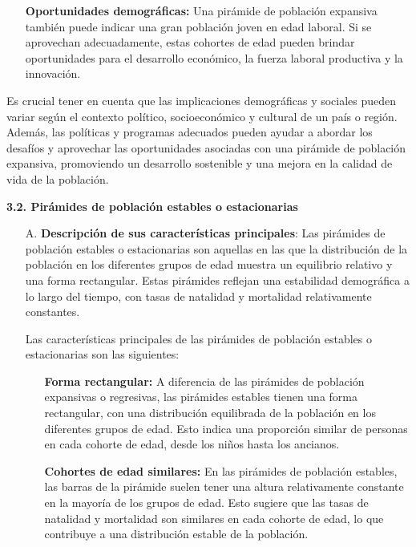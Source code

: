 \documentclass[8pt,a4paper]{beamer}
\begin{document}
{\begin{frame}{}
\begin{block}{}
\begin{enumerate}
\begin{enumerate}
\begin{itemize}
\item[\ding{65}] \textbf{Oportunidades demográficas:} Una pirámide de población expansiva también puede indicar una gran población joven en edad laboral. Si se aprovechan adecuadamente, estas cohortes de edad pueden brindar oportunidades para el desarrollo económico, la fuerza laboral productiva y la innovación.
\end{itemize}
\end{enumerate}
Es crucial tener en cuenta que las implicaciones demográficas y sociales pueden variar según el contexto político, socioeconómico y cultural de un país o región. Además, las políticas y programas adecuados pueden ayudar a abordar los desafíos y aprovechar las oportunidades asociadas con una pirámide de población expansiva, promoviendo un desarrollo sostenible y una mejora en la calidad de vida de la población.
\end{enumerate}
\end{block}
\end{frame}

\begin{frame}{}
\begin{block}{\textbf{3.2. Pirámides de población estables o estacionarias}}
\justifying
\begin{enumerate}
\justifying
\item[A.] \textbf{Descripción de sus características principales}:  Las pirámides de población estables o estacionarias son aquellas en las que la distribución de la población en los diferentes grupos de edad muestra un equilibrio relativo y una forma rectangular. Estas pirámides reflejan una estabilidad demográfica a lo largo del tiempo, con tasas de natalidad y mortalidad relativamente constantes.

Las características principales de las pirámides de población estables o estacionarias son las siguientes:
\begin{itemize}
\justifying
\item[\ding{65}] \textbf{Forma rectangular:} A diferencia de las pirámides de población expansivas o regresivas, las pirámides estables tienen una forma rectangular, con una distribución equilibrada de la población en los diferentes grupos de edad. Esto indica una proporción similar de personas en cada cohorte de edad, desde los niños hasta los ancianos.

\item[\ding{65}] \textbf{Cohortes de edad similares:} En las pirámides de población estables, las barras de la pirámide suelen tener una altura relativamente constante en la mayoría de los grupos de edad. Esto sugiere que las tasas de natalidad y mortalidad son similares en cada cohorte de edad, lo que contribuye a una distribución estable de la población.


\end{itemize}
\end{enumerate}
\end{block}
\end{frame}}
\end{document}

